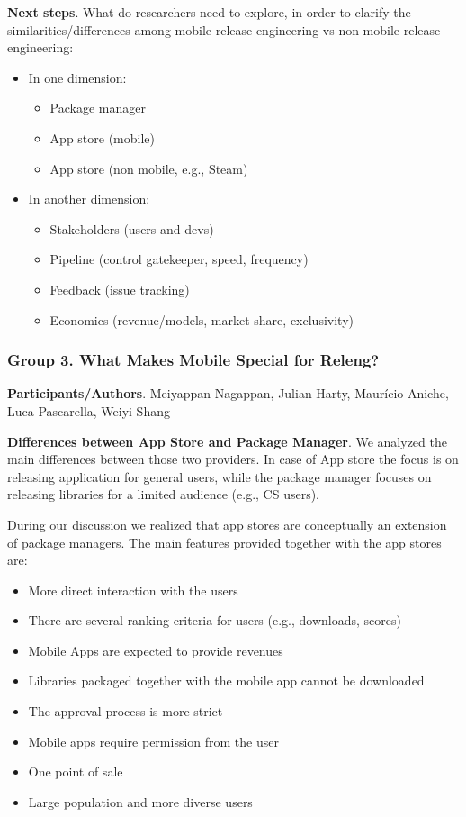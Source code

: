 \documentclass[a4paper]{article}
\newcommand{\smallsection}[1]{\noindent \textbf{#1}. }
\begin{document}
\smallsection{Next steps}
What do researchers need to explore, in order to clarify the
similarities/differences among mobile release engineering vs non-mobile
release engineering:

\begin{itemize}
\tightlist
\item
  In one dimension:

  \begin{itemize}
  \tightlist
  \item
    Package manager
  \item
    App store (mobile)
  \item
    App store (non mobile, e.g., Steam)
  \end{itemize}
\item
  In another dimension:

  \begin{itemize}
  \tightlist
  \item
    Stakeholders (users and devs)
  \item
    Pipeline (control gatekeeper, speed, frequency)
  \item
    Feedback (issue tracking)
  \item
    Economics (revenue/models, market share, exclusivity)
  \end{itemize}
\end{itemize}

\subsubsection{Group 3. What Makes Mobile Special for Releng?}
\smallsection{Participants/Authors}
Meiyappan Nagappan, Julian Harty, Maur\'{i}cio Aniche, Luca Pascarella, Weiyi Shang

\smallsection{Differences between App Store and Package
Manager}
We analyzed the main differences between those two providers. In case of
App store the focus is on releasing application for general users, while
the package manager focuses on releasing libraries for a limited
audience (e.g., CS users).

During our discussion we realized that app stores are conceptually an
extension of package managers. The main features provided together with
the app stores are:

\begin{itemize}
\tightlist
\item
  More direct interaction with the users
\item
  There are several ranking criteria for users (e.g., downloads, scores)
\item
  Mobile Apps are expected to provide revenues
\item
  Libraries packaged together with the mobile app cannot be downloaded
\item
  The approval process is more strict
\item
  Mobile apps require permission from the user
\item
  One point of sale
\item
  Large population and more diverse users
\end{itemize}
\end{document}
